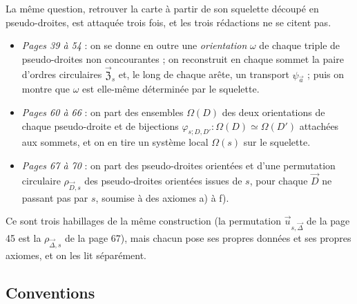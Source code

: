 \documentclass[11pt,a4paper]{article}
\begin{document}
La même question, retrouver la carte à partir de son squelette découpé en
pseudo-droites, est attaquée trois fois, et les trois rédactions ne se
citent pas.
\begin{itemize}
  \item \emph{Pages 39 à 54} : on se donne en outre une \emph{orientation}
  $\omega$ de chaque triple de pseudo-droites non concourantes ; on
  reconstruit en chaque sommet la paire d'ordres circulaires
  $\vec{\mathfrak{Z}}_s$ et, le long de chaque arête, un transport
  $\psi_{\vec{a}}$ ; puis on montre que $\omega$ est elle-même déterminée par
  le squelette.
  \item \emph{Pages 60 à 66} : on part des ensembles $\Omega(D)$ des deux
  orientations de chaque pseudo-droite et de bijections
  $\varphi_{s;D,D'} : \Omega(D) \simeq \Omega(D')$ attachées aux sommets, et
  on en tire un système local $\Omega(s)$ sur le squelette.
  \item \emph{Pages 67 à 70} : on part des pseudo-droites orientées et d'une
  permutation circulaire $\rho_{\vec{D},s}$ des pseudo-droites orientées
  issues de $s$, pour chaque $\vec{D}$ ne passant pas par $s$, soumise à des
  axiomes a) à f).
\end{itemize}
Ce sont trois habillages de la même construction (la permutation
$\vec{u}_{s,\vec{\Delta}}$ de la page 45 est la
$\rho_{\vec{\Delta},s}$ de la page 67), mais chacun pose ses propres
données et ses propres axiomes, et on les lit séparément.

\subsection*{Conventions}
\end{document}
